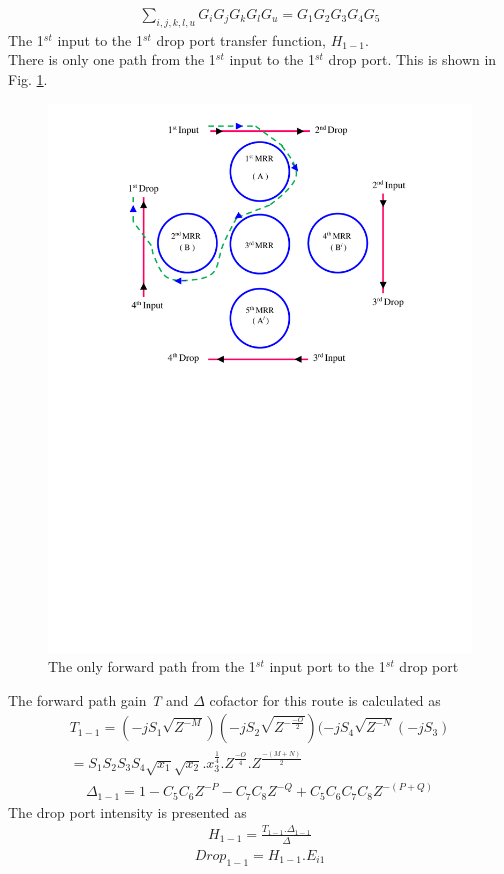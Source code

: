 \documentclass{osa-article}
\begin{document}
\begin{equation}
\begin{split}
\sum_{i,j,k,l,u} {G_i G_j G_kG_lG_u}=G_1G_2G_3G_4G_5 
\label{eqa46}
\end{split}
\end{equation}
The 1$^{st}$ input to the 1$^{st}$ drop port transfer function, $H_{1-1}$.\\

There is only one path from the 1$^{st}$ input to the 1$^{st}$ drop port. This is shown in Fig. \ref{fig2a_ID11}.\\
  \begin{figure}[tb]
\centering
\includegraphics[width=3 in]{figs/fig2a_ID11.pdf}
	\caption{The only forward path from the 1$^{st}$ input port to the 1$^{st}$ drop port}
	\label{fig2a_ID11}
\end{figure} 
The forward path gain \textit {T} and $\Delta$ cofactor for this route is calculated as\\
\begin{equation}
\begin{split}
T_{1-1}=(-jS_{1}\sqrt{Z^{-M}})(-jS_{2}\sqrt{Z^{-\frac{-O}{2}}})(-jS_{4}\sqrt{Z^{-N}}(-jS_3)\\
=S_1S_2S_3S_4\sqrt{x_1}\sqrt{x_2}.{x^{\frac{1}{4}}_3}.Z^{\frac{-O}{4}}.Z^{\frac{-(M+N)}{2}}
\label{eqa47}
\end{split}
\end{equation}
\begin{equation}
\begin{split}
\Delta_{1-1}=1-C_5C_6Z^{-P}-C_7C_8Z^{-Q}+C_5C_6C_7C_8Z^{-(P+Q)}
\label{eqa48}
\end{split}
\end{equation}
The drop port intensity is presented as\\
\begin{equation}
\begin{split}
H_{1-1}=\frac{T_{1-1}.\Delta_{1-1}}{\Delta}
\label{eqa49}
\end{split}
\end{equation}
\begin{equation}
\begin{split}
Drop_{1-1}=H_{1-1}.E_{i1}
\label{eqa50}
\end{split}
\end{equation}
\end{document}
